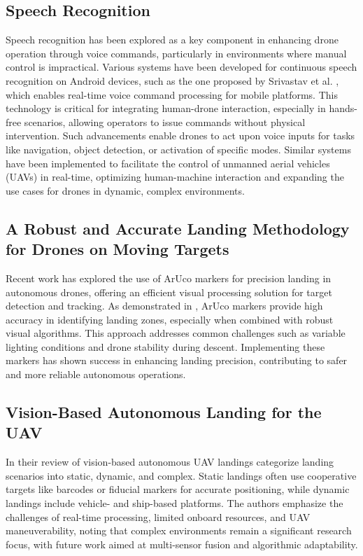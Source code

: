 \documentclass[unnumsec,webpdf,modern,large]{mam-authoring-template}%
\begin{document}
\subsection{Speech Recognition}
Speech recognition has been explored as a key component in enhancing drone operation through voice commands, particularly in environments where manual control is impractical. Various systems have been developed for continuous speech recognition on Android devices, such as the one proposed by Srivastav et al. \cite{SpeechRecognition}, which enables real-time voice command processing for mobile platforms. 
This technology is critical for integrating human-drone interaction, especially in hands-free scenarios, allowing operators to issue commands without physical intervention. Such advancements enable drones to act upon voice inputs for tasks like navigation, object detection, or activation of specific modes. Similar systems have been implemented to facilitate the control of unmanned aerial vehicles (UAVs) in real-time, optimizing human-machine interaction and expanding the use cases for drones in dynamic, complex environments.

\subsection{A Robust and Accurate Landing Methodology for Drones on Moving Targets}
Recent work has explored the use of ArUco markers for precision landing in autonomous drones, offering an efficient visual processing solution for target detection and tracking. As demonstrated in \cite{drones6040098}, ArUco markers provide high accuracy in identifying landing zones, especially when combined with robust visual algorithms. This approach addresses common challenges such as variable lighting conditions and drone stability during descent. Implementing these markers has shown success in enhancing landing precision, contributing to safer and more reliable autonomous operations.

\subsection{Vision-Based Autonomous Landing for the UAV}
In their review of vision-based autonomous UAV landings \cite{aerospace9110634} categorize landing scenarios into static, dynamic, and complex. Static landings often use cooperative targets like barcodes or fiducial markers for accurate positioning, while dynamic landings include vehicle- and ship-based platforms. The authors emphasize the challenges of real-time processing, limited onboard resources, and UAV maneuverability, noting that complex environments remain a significant research focus, with future work aimed at multi-sensor fusion and algorithmic adaptability.
\end{document}

